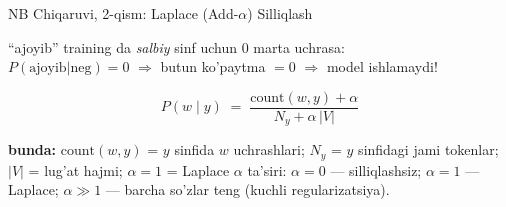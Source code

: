 \documentclass[aspectratio=169,11pt]{beamer}
\newcommand{\bunda}[1]{{\small\textbf{bunda:}\; #1}}
\begin{document}
\begin{frame}{NB Chiqaruvi, 2-qism: Laplace (Add-$\alpha$) Silliqlash}
  \begin{tcolorbox}[warnbox,title=Nol chastota muammosi]
    \small
    ``ajoyib'' training da \textit{salbiy} sinf uchun 0 marta uchrasa:\\
    $P(\text{ajoyib}|\text{neg})=0$
    $\Rightarrow$ butun ko'paytma $=0$
    $\Rightarrow$ model ishlamaydi!
  \end{tcolorbox}
  \vspace{4pt}
  \begin{tcolorbox}[defbox,title=Laplace silliqlash formulasi]
    \[
      P(w\mid y)
      \;=\;
      \frac{\mathrm{count}(w,y)+\alpha}{N_y+\alpha\,|V|}
    \]
  \end{tcolorbox}
  \bunda{%
    $\mathrm{count}(w,y)$ = $y$ sinfida $w$ uchrashlari;\;
    $N_y$ = $y$ sinfidagi jami tokenlar;\;
    $|V|$ = lug'at hajmi;\;
    $\alpha{=}1$ = Laplace%
  }
  \vspace{3pt}
  \small
  $\alpha$ ta'siri:\;
  $\alpha{=}0$ --- silliqlashsiz;\;
  $\alpha{=}1$ --- Laplace;\;
  $\alpha{\gg}1$ --- barcha so'zlar teng (kuchli regularizatsiya).
\end{frame}
\end{document}
